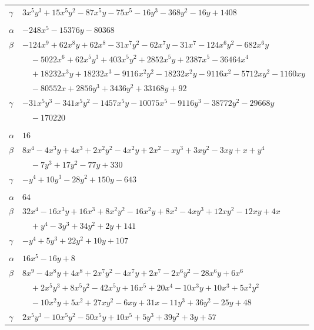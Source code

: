 \documentclass[11pt]{article}
\begin{document}
\begin{longtable}{@{}ll@{}}
$\gamma$ & $3x^{5}y^{3}+15x^{5}y^{2}-87x^{5}y-75x^{5}-16y^{3}-368y^{2}-16y+1408$\\
\addlinespace[3pt]
\multicolumn{2}{@{}l}{$\{i,j\}=\{11,41\}$, $k_{ij}=2^{5}\cdot 3\cdot 5\cdot 11\cdot 17$}\\
$\alpha$ & $-248x^{5}-15376y-80368$\\
$\beta$ & $-124x^{9}+62x^{8}y+62x^{8}-31x^{7}y^{2}-62x^{7}y-31x^{7}-124x^{6}y^{2}-682x^{6}y$\\
 & $\quad -5022x^{6}+62x^{5}y^{3}+403x^{5}y^{2}+2852x^{5}y+2387x^{5}-36464x^{4}$\\
 & $\quad +18232x^{3}y+18232x^{3}-9116x^{2}y^{2}-18232x^{2}y-9116x^{2}-5712xy^{2}-1160xy$\\
 & $\quad -80552x+2856y^{3}+3436y^{2}+33168y+92$\\
$\gamma$ & $-31x^{5}y^{3}-341x^{5}y^{2}-1457x^{5}y-10075x^{5}-9116y^{3}-38772y^{2}-29668y$\\
 & $\quad -170220$\\
\addlinespace[3pt]
\multicolumn{2}{@{}l}{$\{i,j\}=\{12,13\}$, $k_{ij}=2^{5}\cdot 3\cdot 17$}\\
$\alpha$ & $16$\\
$\beta$ & $8x^{4}-4x^{3}y+4x^{3}+2x^{2}y^{2}-4x^{2}y+2x^{2}-xy^{3}+3xy^{2}-3xy+x+y^{4}$\\
 & $\quad -7y^{3}+17y^{2}-77y+330$\\
$\gamma$ & $-y^{4}+10y^{3}-28y^{2}+150y-643$\\
\addlinespace[3pt]
\multicolumn{2}{@{}l}{$\{i,j\}=\{12,17\}$, $k_{ij}=2\cdot 7^{2}$}\\
$\alpha$ & $64$\\
$\beta$ & $32x^{4}-16x^{3}y+16x^{3}+8x^{2}y^{2}-16x^{2}y+8x^{2}-4xy^{3}+12xy^{2}-12xy+4x$\\
 & $\quad +y^{4}-3y^{3}+34y^{2}+2y+141$\\
$\gamma$ & $-y^{4}+5y^{3}+22y^{2}+10y+107$\\
\addlinespace[3pt]
\multicolumn{2}{@{}l}{$\{i,j\}=\{12,23\}$, $k_{ij}=2^{3}\cdot 7$}\\
$\alpha$ & $16x^{5}-16y+8$\\
$\beta$ & $8x^{9}-4x^{8}y+4x^{8}+2x^{7}y^{2}-4x^{7}y+2x^{7}-2x^{6}y^{2}-28x^{6}y+6x^{6}$\\
 & $\quad +2x^{5}y^{3}+8x^{5}y^{2}-42x^{5}y+16x^{5}+20x^{4}-10x^{3}y+10x^{3}+5x^{2}y^{2}$\\
 & $\quad -10x^{2}y+5x^{2}+27xy^{2}-6xy+31x-11y^{3}+36y^{2}-25y+48$\\
$\gamma$ & $2x^{5}y^{3}-10x^{5}y^{2}-50x^{5}y+10x^{5}+5y^{3}+39y^{2}+3y+57$\\

\end{longtable}
\end{document}
